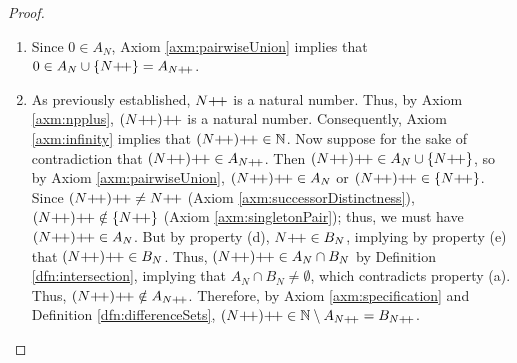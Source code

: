 \documentclass[../main.tex]{subfiles}
\begin{document}
\begin{enumerate}[ref={\thesection.\arabic*}]
\begin{proof}
\begin{enumerate}
            \item Since $0\in A_N$, Axiom \ref{axm:pairwiseUnion} implies that $0\in A_N\cup\{N{+\!+}\}=A_{N{+\!+}}$.
            \item As previously established, $N{+\!+}$ is a natural number. Thus, by Axiom \ref{axm:npplus}, $(N{+\!+}){+\!+}$ is a natural number. Consequently, Axiom \ref{axm:infinity} implies that $(N{+\!+}){+\!+}\in\mathbb{N}$. Now suppose for the sake of contradiction that $(N{+\!+}){+\!+}\in A_{N{+\!+}}$. Then $(N{+\!+}){+\!+}\in A_N\cup\{N{+\!+}\}$, so by Axiom \ref{axm:pairwiseUnion}, $(N{+\!+}){+\!+}\in A_N$ or $(N{+\!+}){+\!+}\in\{N{+\!+}\}$. Since $(N{+\!+}){+\!+}\neq N{+\!+}$ (Axiom \ref{axm:successorDistinctness}), $(N{+\!+}){+\!+}\notin\{N{+\!+}\}$ (Axiom \ref{axm:singletonPair}); thus, we must have $(N{+\!+}){+\!+}\in A_N$. But by property (d), $N{+\!+}\in B_N$, implying by property (e) that $(N{+\!+}){+\!+}\in B_N$. Thus, $(N{+\!+}){+\!+}\in A_N\cap B_N$ by Definition \ref{dfn:intersection}, implying that $A_N\cap B_N\neq\emptyset$, which contradicts property (a). Thus, $(N{+\!+}){+\!+}\notin A_{N{+\!+}}$. Therefore, by Axiom \ref{axm:specification} and Definition \ref{dfn:differenceSets}, $(N{+\!+}){+\!+}\in\mathbb{N}\setminus A_{N{+\!+}}=B_{N{+\!+}}$.

\end{enumerate}
\end{proof}
\end{enumerate}
\end{document}
